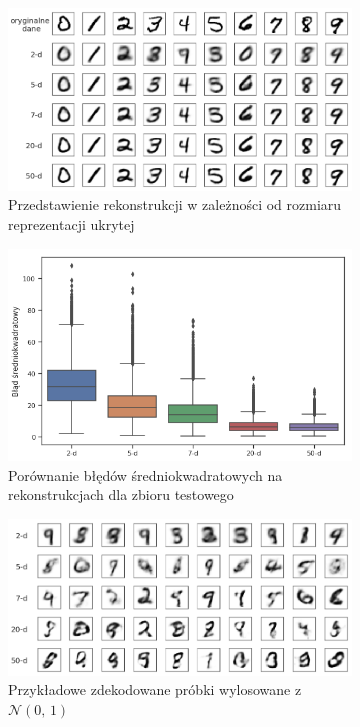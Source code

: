 \begin{figure}[h!]
  \centering
  \begin{subfigure}[b]{0.7\linewidth}
    \includegraphics[width=1.0\textwidth]{images/mnist_recon_v3}
    \caption{Przedstawienie rekonstrukcji w zależności od rozmiaru reprezentacji ukrytej}
  \end{subfigure}
  \begin{subfigure}[b]{0.7\linewidth}
    \includegraphics[width=1.0\textwidth]{images/vae_mse}
    \caption{Porównanie błędów średniokwadratowych na rekonstrukcjach dla zbioru testowego}
  \end{subfigure}
  \begin{subfigure}[b]{0.7\linewidth}
    \includegraphics[width=1.0\textwidth]{images/mnist_gen_v2}
    \caption{Przykładowe zdekodowane próbki wylosowane z $\mathcal{N}(0,\,1)$}
  \end{subfigure}
  \caption{}
  \label{fig:mnist_recon}
\end{figure}

